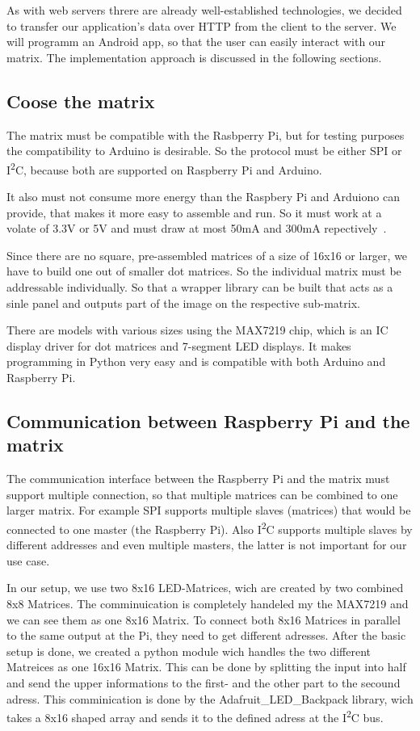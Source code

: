 \documentclass[conference]{IEEEtran}
\begin{document}
As with web servers threre are already well-established technologies, we decided to transfer our application's data over HTTP from the client to the server. We will programm an Android app, so that the user can easily interact with our matrix. The implementation approach is discussed in the following sections.


\subsection{Coose the matrix}
The matrix must be compatible with the Rasbperry Pi, but for testing purposes the compatibility to Arduino is desirable. So the protocol must be either SPI or I\textsuperscript{2}C, because both are supported on Raspberry Pi and Arduino.

It also must not consume more energy than the Raspbery Pi and Arduiono can provide, that makes it more easy to assemble and run. So it must work at a volate of 3.3V or 5V and must draw at most 50mA and 300mA repectively~\cite{rpiperipherals}.

Since there are no square, pre-assembled matrices of a size of 16x16 or larger, we have to build one out of smaller dot matrices. So the individual matrix must be addressable individually. So that a wrapper library can be built that acts as a sinle panel and outputs part of the image on the respective sub-matrix.

There are models with various sizes using the MAX7219 chip, which is an IC display driver for dot matrices and 7-segment LED displays. It makes programming in Python very easy and is compatible with both Arduino and Raspberry Pi.

\subsection{Communication between Raspberry Pi and the matrix}
The communication interface between the Raspberry Pi and the matrix must support multiple connection, so that multiple matrices can be combined to one larger matrix. For example SPI supports multiple slaves (matrices) that would be connected to one master (the Raspberry Pi). Also I\textsuperscript{2}C supports multiple slaves by different addresses and even multiple masters, the latter is not important for our use case.

In our setup, we use two 8x16 LED-Matrices, wich are created by two combined 8x8 Matrices. The comminuication is completely handeled my the MAX7219 and we can see them as one 8x16 Matrix. To connect both 8x16 Matrices in parallel to the same output at the Pi, they need to get different adresses.
After the basic setup is done, we created a python module wich handles the two different Matreices as one 16x16 Matrix. This can be done by splitting the input into half and send the upper informations to the first- and the other part to the secound adress. This comminication is done by the Adafruit\_LED\_Backpack\cite{ledlibrary} library, wich takes a 8x16 shaped array and sends it to the defined adress at the I\textsuperscript{2}C bus.
\end{document}
